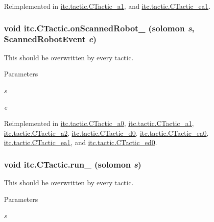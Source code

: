Reimplemented in \hyperlink{classitc_1_1tactic_1_1_c_tactic__a1_ac61ce5dba31a140581a5f6f2dd74d73b}{itc.tactic.CTactic\_\-a1}, and \hyperlink{classitc_1_1tactic_1_1_c_tactic__ea1_a2eb8e76f5f9f629359436a611b8a09e5}{itc.tactic.CTactic\_\-ea1}.\hypertarget{classitc_1_1_c_tactic_a63a5a64ff30293061e37eca71fb77a96}{
\subsubsection[{onScannedRobot\_\-}]{\setlength{\rightskip}{0pt plus 5cm}void itc.CTactic.onScannedRobot\_\- ({\bf solomon} {\em s}, \/  ScannedRobotEvent {\em e})}}
\label{classitc_1_1_c_tactic_a63a5a64ff30293061e37eca71fb77a96}
This should be overwritten by every tactic. 
\begin{DoxyParams}{Parameters}
\item[{\em s}]\item[{\em e}]\end{DoxyParams}


Reimplemented in \hyperlink{classitc_1_1tactic_1_1_c_tactic__a0_aea5ad2191ee16822a129eafb37d91779}{itc.tactic.CTactic\_\-a0}, \hyperlink{classitc_1_1tactic_1_1_c_tactic__a1_aab5562fb9a1ed47924bdf4c1d6eb10de}{itc.tactic.CTactic\_\-a1}, \hyperlink{classitc_1_1tactic_1_1_c_tactic__a2_a2448157d91e699740cf8a99f99b0c456}{itc.tactic.CTactic\_\-a2}, \hyperlink{classitc_1_1tactic_1_1_c_tactic__d0_a85a50bae05c5e1b1bf7bdc450325ae0e}{itc.tactic.CTactic\_\-d0}, \hyperlink{classitc_1_1tactic_1_1_c_tactic__ea0_a64e0ac47db137d34d3c52abbde65917f}{itc.tactic.CTactic\_\-ea0}, \hyperlink{classitc_1_1tactic_1_1_c_tactic__ea1_aa483435460b0ee4fabe62e2d46493c7d}{itc.tactic.CTactic\_\-ea1}, and \hyperlink{classitc_1_1tactic_1_1_c_tactic__ed0_aa1b6857853a2bc90fcf4309b39a3907a}{itc.tactic.CTactic\_\-ed0}.\hypertarget{classitc_1_1_c_tactic_ae5f5c51a6e04d22bc298dbdec4080770}{
\subsubsection[{run\_\-}]{\setlength{\rightskip}{0pt plus 5cm}void itc.CTactic.run\_\- ({\bf solomon} {\em s})}}
\label{classitc_1_1_c_tactic_ae5f5c51a6e04d22bc298dbdec4080770}
This should be overwritten by every tactic. 
\begin{DoxyParams}{Parameters}
\item[{\em s}]\end{DoxyParams}


